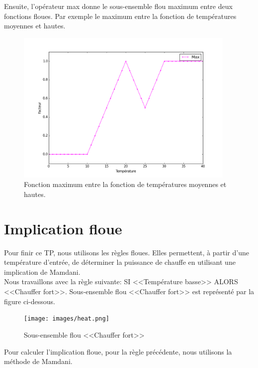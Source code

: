 \documentclass[a4paper,11pt]{article}
\begin{document}
Ensuite, l'opérateur max donne le sous-ensemble flou maximum 
entre deux fonctions floues. Par exemple le maximum entre la 
fonction de températures moyennes et hautes.

\begin{figure}[H]
  \begin{center}
  \includegraphics[height=280px]{images/max.png}
  \caption{Fonction maximum entre la fonction de températures moyennes et hautes.}
  \end{center}
\end{figure}

\newpage

\section{Implication floue}

Pour finir ce TP, nous utilisons les règles floues. Elles 
permettent, à partir d'une température d'entrée, de déterminer 
la puissance de chauffe en utilisant une implication de Mamdani.\\

Nous travaillons avec la règle suivante: SI <<Température basse>> 
ALORS <<Chauffer fort>>. Sous-ensemble flou <<Chauffer fort>> est 
représenté par la figure ci-dessous.

\begin{figure}[H]
  \begin{center}
  \texttt{[image: images/heat.png]}
  \caption{Sous-ensemble flou <<Chauffer fort>>}
  \end{center}
\end{figure}

Pour calculer l'implication floue, pour la règle précédente, 
nous utilisons la méthode de Mamdani.\\
\end{document}
